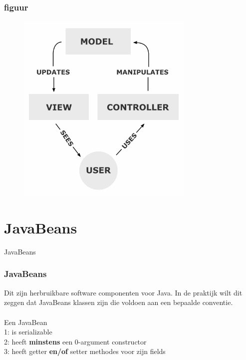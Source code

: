 \documentclass{beamer}
\begin{document}
\begin{frame}

\frametitle{figuur}

\begin{figure}

\includegraphics[scale=0.5]{MVC-Process}

\end{figure}

\end{frame}

\section{JavaBeans}


\begin{frame}

JavaBeans

\end{frame}

\begin{frame}

\frametitle{JavaBeans}

Dit zijn herbruikbare software componenten voor Java. In de praktijk wilt dit zeggen dat JavaBeans klassen zijn die voldoen aan een bepaalde conventie.\\~\\
Een JavaBean\\
1: is serializable\\
2: heeft \textbf{minstens} een 0-argument constructor\\
3: heeft getter \textbf{en/of} setter methodes voor zijn fields

\end{frame}
\end{document}
